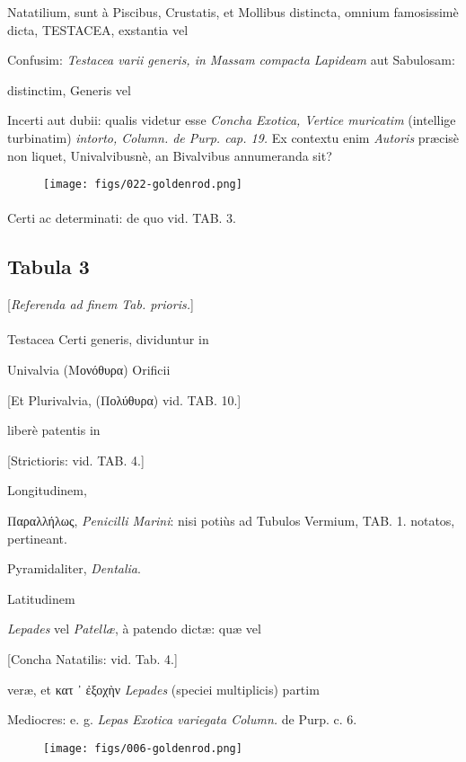 \documentclass[a4paper, 11pt, oneside, polutonikogreek, german]{article}
\begin{document}
Natatilium, sunt à Piscibus, Crustatis, et Mollibus distincta, omnium famosissimè dicta, TESTACEA, exstantia vel

Confusim: \emph{Testacea varii generis, in Massam compacta Lapideam} aut Sabulosam:

distinctim, Generis vel

Incerti aut dubii: qualis videtur esse \emph{Concha Exotica, Vertice muricatim} (intellige turbinatim) \emph{intorto, Column. de Purp. cap. 19.} Ex contextu enim \emph{Autoris} præcisè non liquet, Univalvibusnè, an Bivalvibus annumeranda sit?
\begin{figure}[H]
\centering
\texttt{[image: figs/022-goldenrod.png]}
\end{figure}
\paragraph{}

Certi ac determinati: de quo vid. TAB. 3.
\clearpage
\subsection{Tabula 3}
\begin{center}
[\emph{Referenda ad finem Tab. prioris.}]
\end{center}
\paragraph{}
Testacea Certi generis, dividuntur in

Univalvia (Μονόθυρα) Orificii

[Et Plurivalvia, (Πολύθυρα) vid. TAB. 10.]

liberè patentis in

[Strictioris: vid. TAB. 4.]

Longitudinem,

Παραλλήλως, \emph{Penicilli Marini}: nisi potiùs ad Tubulos Vermium, TAB. 1. notatos, pertineant.

Pyramidaliter, \emph{Dentalia}.

Latitudinem

\emph{Lepades} vel \emph{Patellæ}, à patendo dictæ: quæ vel

[Concha Natatilis: vid. Tab. 4.]

veræ, et κατ ᾽ ἐξοχὴν \emph{Lepades} (speciei multiplicis) partim

Mediocres: e. g. \emph{Lepas Exotica variegata Column.} de Purp. c. 6.
\begin{figure}[H]
\centering
\texttt{[image: figs/006-goldenrod.png]}
\end{figure}
\end{document}
